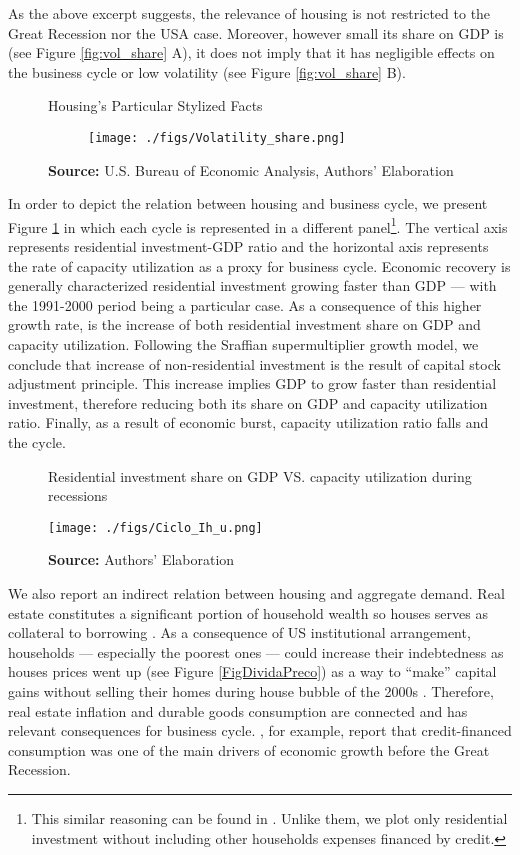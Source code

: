 \documentclass[12pt, a4]{article}
\begin{document}
As the above excerpt suggests, the relevance of housing is not restricted to the Great Recession nor the USA case.
Moreover, however small its share on GDP is (see Figure \ref{fig:vol_share} A), it does not imply that it has negligible effects on the business cycle or low volatility (see Figure \ref{fig:vol_share} B).

\begin{figure}[H]
    \centering
	\caption{Housing's Particular Stylized Facts}
	\label{fig:vol_share}
\begin{figure}[htb]
    \texttt{[image: ./figs/Volatility\_share.png]}
    \end{figure}
	\caption*{\textbf{Source:} U.S. Bureau of Economic Analysis, Authors' Elaboration}
\end{figure}



In order to depict the relation between housing and business cycle, we present Figure \ref{FigIh_u}  in which each cycle is represented in a different panel\footnote{This similar reasoning can be found in \textcites{fiebiger_trend_2017}. Unlike them, we plot only residential investment without including other households expenses financed by credit.}. 
The vertical axis represents residential investment-GDP ratio and the horizontal
axis represents the rate of capacity utilization as a proxy for business cycle.
Economic recovery is generally characterized residential investment growing faster than GDP --- with the 1991-2000 period being a particular case. 
As a consequence of this higher growth rate, is the increase of both residential investment share on GDP and capacity utilization. 
Following the Sraffian supermultiplier growth model, we conclude that increase of non-residential investment is the result of capital stock adjustment principle.
This increase implies GDP to grow faster than residential investment, therefore reducing both its share on GDP and capacity utilization ratio. 
Finally, as a result of economic burst, capacity utilization ratio falls and the cycle.

\begin{figure}[H]
	\centering
	\caption{Residential investment share on GDP VS. capacity utilization during recessions}
	\label{FigIh_u}
	\texttt{[image: ./figs/Ciclo\_Ih\_u.png]}
	\caption*{\textbf{Source:} Authors' Elaboration}
\end{figure}

We also report an indirect relation between housing and aggregate demand. 
Real estate constitutes a significant portion of household wealth so houses serves as collateral to borrowing \cite{teixeira_uma_2011}. 
As a consequence of US institutional arrangement, households --- especially the poorest ones --- could increase their indebtedness as houses prices went up (see Figure \ref{FigDividaPreco}) as a way to ``make'' capital gains without 
selling their homes during house bubble of the 2000s \cite{teixeira_crescimento_2015}.
Therefore, real estate inflation and durable goods consumption are connected and has relevant consequences for business cycle.
\textcites{zezza_u.s._2008}{barba_rising_2009}, for example, report that credit-financed consumption was one of the main drivers of economic growth before the Great Recession.
\end{document}
